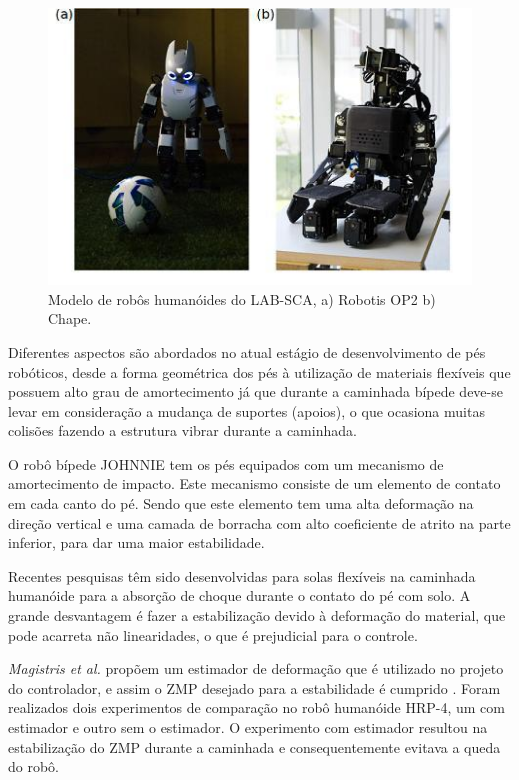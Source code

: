 \begin{figure}[!htb]
\centering
\includegraphics{img10}
\caption{Modelo de robôs humanóides do LAB-SCA, a) Robotis OP2 b) Chape.}
\label{Rotulo}
\end{figure}

Diferentes aspectos são abordados no atual estágio de desenvolvimento de pés robóticos, desde a forma geométrica dos pés à utilização de materiais flexíveis que possuem alto grau de amortecimento já que durante a caminhada bípede  deve-se levar em consideração a mudança de suportes (apoios), o que ocasiona muitas colisões fazendo a estrutura vibrar durante a caminhada.

O robô bípede JOHNNIE \cite{jonhie2006} tem os pés equipados com um mecanismo de amortecimento de impacto. Este mecanismo consiste de um elemento de contato em cada canto do pé. Sendo que este elemento tem uma alta deformação na direção vertical e uma camada de borracha com alto coeficiente de atrito na parte inferior, para dar uma maior estabilidade.
  
Recentes pesquisas têm sido desenvolvidas para solas flexíveis na caminhada humanóide para a absorção de choque durante o contato do pé com solo. A grande desvantagem é fazer a estabilização devido à deformação do material, que pode acarreta não linearidades\cite{conem2018}, o que é prejudicial para o controle.

\textit{Magistris et al.}  propõem um  estimador de deformação que é utilizado no projeto do controlador, e assim o ZMP desejado para a estabilidade é cumprido \cite{sola2016}. Foram realizados dois experimentos de comparação no robô humanóide HRP-4, um com estimador e outro sem o estimador. O experimento com estimador resultou na estabilização do ZMP durante a caminhada e consequentemente evitava a queda do robô.
 
